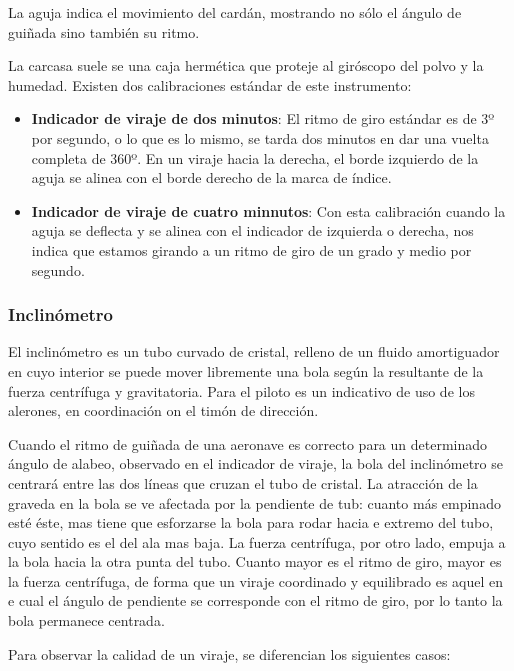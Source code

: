 \documentclass{article}
\begin{document}
La aguja indica el movimiento del cardán, mostrando no sólo el ángulo de guiñada
sino también su ritmo.

La carcasa suele se una caja hermética que proteje al giróscopo del polvo y la humedad. Existen dos calibraciones estándar de este instrumento:

\begin{itemize}
  \item \textbf{Indicador de viraje de dos minutos}: El ritmo de giro estándar es de 3º por segundo, o lo que es lo mismo, se tarda dos minutos en dar una vuelta completa de 360º. En un viraje hacia la derecha, el borde izquierdo de la aguja se alinea con el borde derecho de la marca de índice.
  \item \textbf{Indicador de viraje de cuatro minnutos}:  Con esta calibración  cuando la aguja se deflecta y se alinea con el indicador de izquierda o derecha, nos indica que estamos girando a un ritmo de giro de un grado y medio por segundo.
\end{itemize}

\subsubsection*{Inclinómetro}
El inclinómetro es un tubo curvado de cristal, relleno de un fluido amortiguador en cuyo interior se puede mover libremente una bola según la resultante de la fuerza centrífuga y gravitatoria. Para el piloto es un indicativo de uso de los alerones, en coordinación on el timón de dirección.

Cuando el ritmo de guiñada de una aeronave es correcto para un determinado ángulo de alabeo, observado en el indicador de viraje, la bola del inclinómetro se centrará entre las dos líneas que cruzan el tubo de cristal. 
La atracción de la graveda en la bola se ve afectada por la pendiente de tub: cuanto más empinado esté éste, mas tiene que esforzarse la bola para rodar hacia e extremo del tubo, cuyo sentido es el del ala mas baja. La fuerza centrífuga, por otro lado, empuja a la bola hacia la otra punta del tubo. Cuanto mayor es el ritmo de giro, mayor es la fuerza centrífuga, de forma que un viraje coordinado y equilibrado es aquel en e cual el ángulo de pendiente se corresponde con el ritmo de giro, por lo tanto la bola permanece centrada.

Para observar la calidad de un viraje, se diferencian los siguientes casos:
\end{document}
